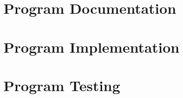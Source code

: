 \chapter{Program Documentation}
	
	
	

\chapter{Program Implementation}
	
	

\chapter{Program Testing}
	

